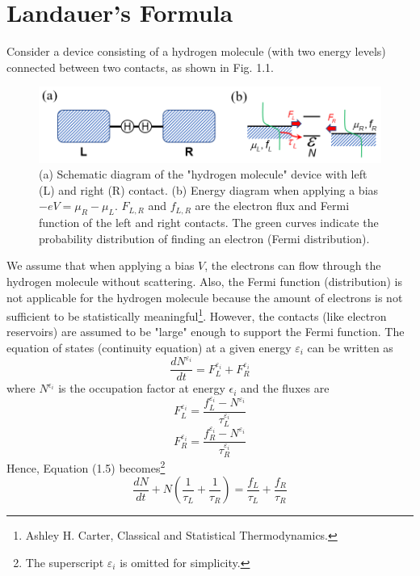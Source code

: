 \section{Landauer's Formula}
Consider a device consisting of a hydrogen molecule (with two energy levels) connected between two contacts, as shown in Fig. 1.1. 
\begin{figure}[t]
\includegraphics[width=\textwidth]{figures/Fig1_1}
\caption{\small (a) Schematic diagram of the "hydrogen molecule" device with left (L) and right (R) contact. (b) Energy diagram when applying a bias $-eV = \mu_{R}-\mu_{L}$. $F_{L,R}$ and $f_{L,R}$ are the electron flux and Fermi function of the left and right contacts. The green curves indicate the probability distribution of finding an electron (Fermi distribution).}
\end{figure}
We assume that when applying a bias $V$, the electrons can flow through the hydrogen molecule without scattering. Also, the Fermi function (distribution) is not applicable for the hydrogen molecule because the amount of electrons is not sufficient to be statistically meaningful\footnote{Ashley H. Carter, Classical and Statistical Thermodynamics.}. However, the contacts (like electron reservoirs) are assumed to be "large" enough to support the Fermi function. The equation of states (continuity equation) at a given energy $\varepsilon_i$ can be written as 
\begin{equation}
\frac{dN^{\varepsilon_i}}{dt} = F^{\varepsilon_i}_{L} + F^{\varepsilon_i}_{R}
\end{equation} 
where $N^{\epsilon_i}$ is the occupation factor at energy $\epsilon_i$ and the fluxes are 
\begin{equation}
F^{\varepsilon_i}_{L} = \frac{f^{\varepsilon_i}_{L}-N^{\varepsilon_i}}{\tau^{\varepsilon_i}_{L}}
\end{equation}
\begin{equation}
F^{\varepsilon_i}_{R} = \frac{f^{\varepsilon_i}_{R}-N^{\varepsilon_i}}{\tau^{\varepsilon_i}_{R}}
\end{equation} 
Hence, Equation (1.5) becomes\footnote{The superscript $\varepsilon_i$ is omitted for simplicity.} 
\begin{equation}
\frac{dN}{dt} + N \left(\frac{1}{\tau_{L}}+\frac{1}{\tau_{R}}\right) = \frac{f_{L}}{\tau_{L}}+\frac{f_{R}}{\tau_{R}}
\end{equation} 
